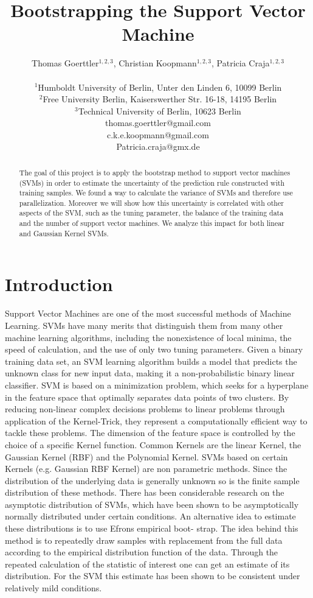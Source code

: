 \documentclass[letterpaper]{article}
\title{Bootstrapping the Support Vector Machine}
\author{Thomas Goerttler$^{1,2,3}$, Christian Koopmann$^{1,2,3}$, Patricia Craja$^{1,2,3}$ \\
\mbox{}\\
$^1$Humboldt University of Berlin, Unter den Linden 6, 10099 Berlin \\
$^2$Free University Berlin, Kaiserswerther Str. 16-18, 14195 Berlin \\
$^3$Technical University of Berlin, 10623 Berlin \\
thomas.goerttler@gmail.com\\
c.k.e.koopmann@gmail.com\\
Patricia.craja@gmx.de\\
}
\begin{document}
\maketitle

\begin{abstract}
The goal of this project is to apply the bootstrap method to support vector machines (SVMs) in order to estimate the uncertainty of the prediction rule constructed with training samples. We found a way to calculate the variance of SVMs and therefore use parallelization. Moreover we will show how this uncertainty is correlated with other aspects of the SVM, such as the tuning parameter, the balance of the training data and the number of support vector machines. We analyze this impact for both linear and Gaussian Kernel SVMs.
  
\end{abstract}

\section{Introduction}

	Support Vector Machines are one of the most successful methods of Machine Learning. SVMs have many merits that distinguish them from many other machine learning algorithms, including the nonexistence of local minima, the speed of calculation, and the use of only two tuning parameters. Given a binary training data set, an SVM learning algorithm builds a model that predicts the unknown class for new input data, making it a non-probabilistic binary linear classifier. SVM is based on a minimization problem, which seeks for a hyperplane in the feature space that optimally separates data points of two clusters.  By reducing non-linear complex decisions problems to linear problems through application of the Kernel-Trick, they represent a computationally efficient way to tackle these problems. The dimension of the feature space is controlled by the choice of a specific Kernel function. Common Kernels are the linear Kernel, the Gaussian Kernel (RBF) and the Polynomial Kernel.
    SVMs based on certain Kernels (e.g. Gaussian RBF Kernel) are non parametric methods. Since the distribution of the underlying data is generally unknown so is the finite sample distribution of these methods. 
There has been considerable research on the asymptotic distribution of SVMs, which have been shown to be asymptotically normally distributed under certain conditions. An alternative idea to estimate these distributions is to use Efrons empirical boot- strap. The idea behind this method is to repeatedly draw samples with replacement from the full data according to the empirical distribution function of the data. Through the repeated calculation of the statistic of interest one can get an estimate of its distribution. For the SVM this estimate has been shown to be consistent under relatively mild conditions.
    
\end{document}
